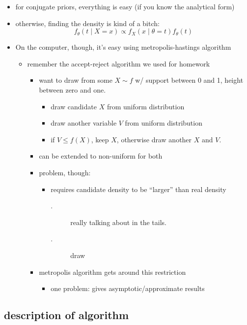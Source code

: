 \begin{itemize}
\item for conjugate priors, everything is easy (if you know the analytical form)
\item otherwise, finding the density is kind of a bitch:
  \[f_θ(t ∣ X = x) ∝ f_X(x ∣ θ = t) f_θ(t)\]
\item On the computer, though, it's easy using metropolis-hastings algorithm
\begin{itemize}
\item remember the accept-reject algorithm we used for homework
\begin{itemize}
\item want to draw from some $X ∼ f$ w/ support between 0 and 1,
         height between zero and one.
\begin{itemize}
\item draw candidate $X$ from uniform distribution
\item draw another variable $V$ from uniform distribution
\item if $V ≤ f(X)$, keep $X$, otherwise draw another $X$ and $V$.
\end{itemize}
\item can be extended to non-uniform for both
\item problem, though:
\begin{itemize}
\item requires candidate density to be ``larger'' than real density
\begin{description}
\item[.] really talking about in the tails.
\item[.] draw
\end{description}
\end{itemize}
\item metropolis algorithm gets around this restriction
\begin{itemize}
\item one problem: gives asymptotic/approximate results
\end{itemize}
\end{itemize}
\end{itemize}
\end{itemize}

\subsection{description of algorithm \citep[page 254]{CB02}}

